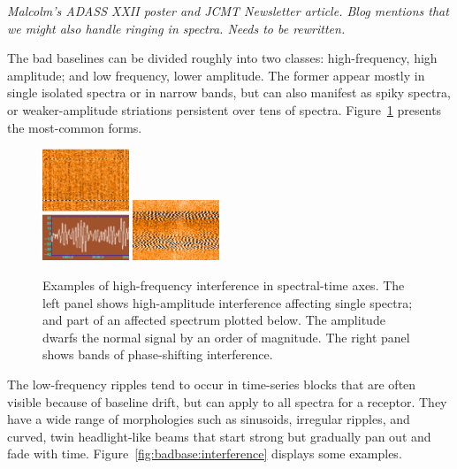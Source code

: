 \documentclass[final,authoryear,5p,times,twocolumn]{elsarticle}
\begin{document}
\textit{\color{red} Malcolm's ADASS XXII poster \citep{2013ASPC..475..341C} and JCMT Newsletter article. Blog mentions
that we might also handle ringing in spectra. Needs to be rewritten.}

The bad baselines can be divided roughly into two classes:
high-frequency, high amplitude; and low frequency, lower
amplitude. The former appear mostly in single isolated spectra or in
narrow bands, but can also manifest as spiky spectra, or
weaker-amplitude striations persistent over tens of spectra.
Figure~\ref{fig:badbase:highfreq} presents the most-common forms.

\begin{figure}[!ht]
\includegraphics[width=0.23\textwidth]{P61_f1a}
\includegraphics[width=0.23\textwidth]{P61_f1b}
\caption{Examples of high-frequency interference in spectral-time
  axes. The left panel shows high-amplitude interference affecting
  single spectra; and part of an affected spectrum plotted below. The
  amplitude dwarfs the normal signal by an order of magnitude. The
  right panel shows bands of phase-shifting interference.}
\label{fig:badbase:highfreq}
\end{figure}

The low-frequency ripples tend to occur in time-series blocks that are
often visible because of baseline drift, but can apply to all spectra
for a receptor. They have a wide range of morphologies such as
sinusoids, irregular ripples, and curved, twin headlight-like beams
that start strong but gradually pan out and fade with time.
Figure~\ref{fig:badbase:interference} displays some examples.
\end{document}
